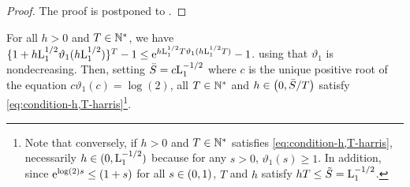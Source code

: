\begin{proof}
The proof is postponed to .
\end{proof}
For all $h > 0$ and $T \in \mathbb{N}^{*}$, we have
$\{1 + h \mathrm{L}_1^{1/2} \vartheta_1(h \mathrm{L}_1^{1/2} ) \}^T -1 \leq \mathrm{e}^{h \mathrm{L}_1^{1/2} T \vartheta_1(h \mathrm{L}_1^{1/2} T)} -1$.
using that  $\vartheta_1$ is nondecreasing.
Then, setting $\bar{S} = c \mathrm{L}_1^{-1/2}$ where $c$ is   the unique positive root  of the equation
$c \vartheta_1(c)  = \log(2)$,  all $T \in \mathbb{N}^{*}$ and $h  \in \left(0,\bar{S}/T\right)$ satisfy \eqref{eq:condition-h,T-harris}\footnote{Note that conversely, if $h >0$ and $T \in \mathbb{N}^{*}$ satisfies \eqref{eq:condition-h,T-harris}, necessarily $h \in (0,\mathrm{L}_1^{-1/2})$ because for any $s > 0$, $\vartheta_1(s) \geq 1$. In addition, since $\mathrm{e}^{\log(2) s} \leq (1+s)$ for all $s \in (0,1)$, $T$ and $h$ satisfy $hT \leq \tilde{S}= \mathrm{L}_1^{-1/2}$.
}.






